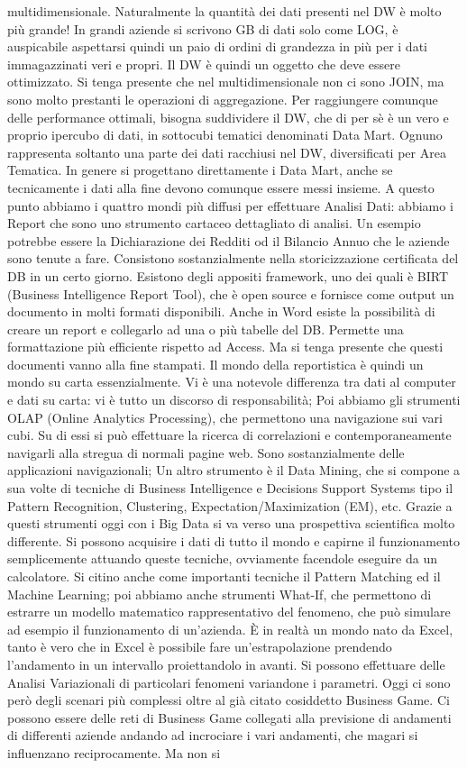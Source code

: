 multidimensionale. Naturalmente la quantità dei dati presenti nel DW è molto più grande! In grandi aziende si scrivono GB di dati solo come LOG, è auspicabile aspettarsi quindi un paio di ordini di grandezza in più per i dati immagazzinati veri e propri. Il DW è quindi un oggetto che deve essere ottimizzato. Si tenga presente che nel multidimensionale non ci sono JOIN, ma sono molto prestanti le operazioni di aggregazione. Per raggiungere comunque delle performance ottimali, bisogna suddividere il DW, che di per sè è un vero e proprio ipercubo di dati, in sottocubi tematici denominati Data Mart. Ognuno rappresenta soltanto una parte dei dati racchiusi nel DW, diversificati per Area Tematica. In genere si progettano direttamente i Data Mart, anche se tecnicamente i dati alla fine devono comunque essere messi insieme. A questo punto abbiamo i quattro mondi più diffusi per effettuare Analisi Dati: abbiamo i Report che sono uno strumento cartaceo dettagliato di analisi. Un esempio potrebbe essere la Dichiarazione dei Redditi od il Bilancio Annuo che le aziende sono tenute a fare. Consistono sostanzialmente nella storicizzazione certificata del DB in un certo giorno. Esistono degli appositi framework, uno dei quali è BIRT (Business Intelligence Report Tool), che è open source e fornisce come output un documento in molti formati disponibili. Anche in Word esiste la possibilità di creare un report e collegarlo ad una o più tabelle del DB. Permette una formattazione più efficiente rispetto ad Access. Ma si tenga presente che questi documenti vanno alla fine stampati. Il mondo della reportistica è quindi un mondo su carta essenzialmente. Vi è una notevole differenza tra dati al computer e dati su carta: vi è tutto un discorso di responsabilità; Poi abbiamo gli strumenti OLAP (Online Analytics Processing), che permettono una navigazione sui vari cubi. Su di essi si può effettuare la ricerca di correlazioni e contemporaneamente navigarli alla stregua di normali pagine web. Sono sostanzialmente delle applicazioni navigazionali; Un altro strumento è il Data Mining, che si compone a sua volte di tecniche di Business Intelligence e Decisions Support Systems tipo il Pattern Recognition, Clustering, Expectation/Maximization (EM), etc. Grazie a questi strumenti oggi con i Big Data si va verso una prospettiva scientifica molto differente. Si possono acquisire i dati di tutto il mondo e capirne il funzionamento semplicemente attuando queste tecniche, ovviamente facendole eseguire da un calcolatore. Si citino anche come importanti tecniche il Pattern Matching ed il Machine Learning; poi abbiamo anche strumenti What-If, che permettono di estrarre un modello matematico rappresentativo del fenomeno, che può simulare ad esempio il funzionamento di un'azienda. \`E in realtà un mondo nato da Excel, tanto è vero che in Excel è possibile fare un'estrapolazione prendendo l'andamento in un intervallo proiettandolo in avanti. Si possono effettuare delle Analisi Variazionali di particolari fenomeni variandone i parametri. Oggi ci sono però degli scenari più complessi oltre al già citato cosiddetto Business Game. Ci possono essere delle reti di Business Game collegati alla previsione di andamenti di differenti aziende andando ad incrociare i vari andamenti, che magari si influenzano reciprocamente. Ma non si 